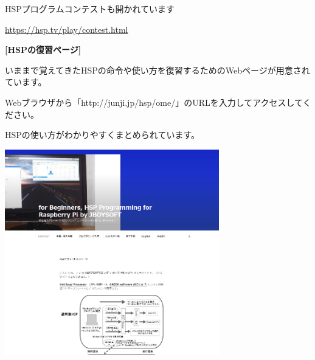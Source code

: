 \documentclass[a4paper,dvipdfmx]{jarticle}
\begin{document}
\bigskip

HSPプログラムコンテストも開かれています

\url{https://hsp.tv/play/contest.html}


\bigskip


\bigskip


\bigskip

{\bfseries
[HSPの復習ページ]}


\bigskip

いままで覚えてきたHSPの命令や使い方を復習するためのWebページが用意されています。

Webブラウザから「http://junji.jp/hsp/ome/」のURLを入力してアクセスしてください。

HSPの使い方がわかりやすくまとめられています。


\bigskip


\bigskip



\begin{center}
\includegraphics[width=9.32cm,height=8.959cm]{text04-img/text04-img042.png}

\end{center}

\bigskip


\bigskip


\bigskip


\bigskip


\bigskip


\bigskip


\bigskip


\bigskip


\bigskip


\bigskip
\end{document}
